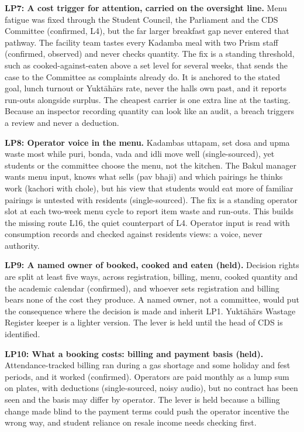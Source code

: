\documentclass[
  10pt,
  table]{article}
\newcounter{none} %
\begin{document}
\textbf{LP7: A cost trigger for attention, carried on the oversight line.} Menu fatigue was fixed through the Student Council, the Parliament and the CDS Committee (confirmed, L4), but the far larger breakfast gap never entered that pathway. The facility team tastes every Kadamba meal with two Prism staff (confirmed, observed) and never checks quantity. The fix is a standing threshold, such as cooked-against-eaten above a set level for several weeks, that sends the case to the Committee as complaints already do. It is anchored to the stated goal, lunch turnout or Yuktāhār\textquotesingle s rate, never the hall\textquotesingle s own past, and it reports run-outs alongside surplus. The cheapest carrier is one extra line at the tasting. Because an inspector recording quantity can look like an audit, a breach triggers a review and never a deduction.

\textbf{LP8: Operator voice in the menu.} Kadamba\textquotesingle s uttapam, set dosa and upma waste most while puri, bonda, vada and idli move well (single-sourced), yet students or the committee choose the menu, not the kitchen. The Bakul manager wants menu input, knows what sells (pav bhaji) and which pairings he thinks work (kachori with chole), but his view that students would eat more of familiar pairings is untested with residents (single-sourced). The fix is a standing operator slot at each two-week menu cycle to report item waste and run-outs. This builds the missing route L16, the quiet counterpart of L4. Operator input is read with consumption records and checked against residents\textquotesingle{} views: a voice, never authority.

\textbf{LP9: A named owner of booked, cooked and eaten (held).} Decision rights are split at least five ways, across registration, billing, menu, cooked quantity and the academic calendar (confirmed), and whoever sets registration and billing bears none of the cost they produce. A named owner, not a committee, would put the consequence where the decision is made and inherit LP1. Yuktāhār\textquotesingle s Wastage Register keeper is a lighter version. The lever is held until the head of CDS is identified.

\textbf{LP10: What a booking costs: billing and payment basis (held).} Attendance-tracked billing ran during a gas shortage and some holiday and fest periods, and it worked (confirmed). Operators are paid monthly as a lump sum on plates, with deductions (single-sourced, noisy audio), but no contract has been seen and the basis may differ by operator. The lever is held because a billing change made blind to the payment terms could push the operator incentive the wrong way, and student reliance on resale income needs checking first.
\end{document}
